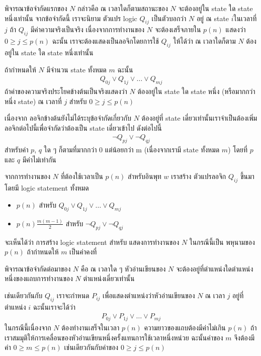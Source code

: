\par{
พิจารณาข้อจำกัดแรกของ $N$ กล่าวคือ ณ เวลาใดก็ตามสถานะของ $N$ จะต้องอยู่ใน state ใด state หนึ่งเท่านั้น จากข้อจำกัดนี้ เราจะนิยาม ตัวแปร logic $Q_{ij}$ เป็นตัวบอกว่า $N$ อยู่ ณ state $i$ในเวลาที่ $j$ ถ้า $Q_{ij}$ มีค่าความจริงเป็นจริง เนื่องจากการทำงานของ $N$ จะต้องเสร็จภายใน $p(n)$ แสดงว่า $0 \ge j \le p(n)$ ฉะนั้น เราจะต้องแสดงเป็นลอจิกโดยการใช้ $Q_{ij}$ ให้ได้ว่า ณ เวลาใดก็ตาม $N$ ต้องอยู่ใน state ใด state หนึ่งเท่านั้น
}

\par{
ถ้ากำหนดให้ $N$ มีจำนวน state ทั้งหมด $m$ ฉะนั้น
%
\begin{eqnarray*}
Q_{0j} \vee Q_{1j} \vee \ldots \vee Q_{mj}
\end{eqnarray*}
%
ถ้าค่าของความจริงประโยคข้างต้นเป็นจริงแสดงว่า $N$ ต้องอยู่ใน state ใด state หนึ่ง (หรือมากกว่าหนึ่ง state) ณ เวลาที่ $j$ สำหรับ $0 \ge j \le p(n)$
}

\par{
เนื่องจาก ลอจิกข้างต้นยังไม่ได้ระบุข้อจำกัดเกี่ยวกับ $N$ ต้องอยู่ที่ state เดี่ยวเท่านั้นเราจำเป็นต้องเพิ่มลอจิกต่อไปนี้เพื่อจำกัดว่าต้องเป็น state เดี่ยวเข้าไป ดังต่อไปนี้
%
\begin{eqnarray*}
\neg Q_{pj} \vee \neg Q_{qj} 
\end{eqnarray*}
%
สำหรับค่า $p$, $q$ ใด ๆ ก็ตามที่มากกว่า 0 แต่น้อยกว่า m (เนื่องจากเรามี state ทั้งหมด $m$) โดยที่ $p$ และ $q$ มีค่าไม่เท่ากัน
}

\par{
จากการทำงานของ $N$ ที่ต้องใช้เวลาเป็น $p(n)$ สำหรับอินพุท $w$ เราสร้าง ตัวแปรลอจิก $Q_{ij}$ ขึ้นมา โดยมี logic statement ทั้งหมด  

\begin{itemize}
\item $p(n)$  สำหรับ $Q_{0j} \vee Q_{1j} \vee \ldots \vee Q_{mj}$
\item $p(n)\frac{m(m-1)}{2}$ สำหรับ $\neg Q_{pj} \vee \neg Q_{qj}$ 
\end{itemize}

จะเห็นได้ว่า การสร้าง logic statement สำหรับ แสดงการทำงานของ $N$ ในกรณีนี้เป็น พหุนามของ $p(n)$ ถ้ากำหนดให้ $m$ เป็นค่าคงที่
}

\par{
พิจารณาข้อจำกัดต่อมาของ $N$ คือ ณ เวลาใด ๆ หัวอ่านเขียนของ $N$ จะต้องอยู่ที่ตำแหน่งใดตำแหน่งหนึ่งของแถบการทำงานของ $N$ ตำแหน่งเดี่ยวเท่านั้น
}

\par{
เช่นเดียวกันกับ $Q_{ij}$ เราจะกำหนด $P_{ij}$ เพื่อแสดงตำแหน่งว่าหัวอ่านเขียนของ $N$ ณ เวลา $j$ อยู่ที่ตำแหน่ง $i$ ฉะนั้นเราจะได้ว่า
%
\begin{eqnarray*}
P_{0j} \vee P_{1j} \vee \ldots \vee P_{mj} 
\end{eqnarray*}
%
ในกรณีนี้เนื่องจาก $N$ ต้องทำงานเสร็จในเวลา $p(n)$ ความยาวของแถบต้องมีค่าไม่เกิน $p(n)$ ถ้าเราสมมุติให้การเคลื่อนของหัวอ่านเขียนหนึ่งครั้งแทนการใช้เวลาหนึ่งหน่วย ฉะนั้นค่าของ $m$ จึงต้องมีค่า $0 \ge m \le p(n)$ เช่นเดียวกันกับค่าของ $0 \ge j \le p(n)$ 
}

